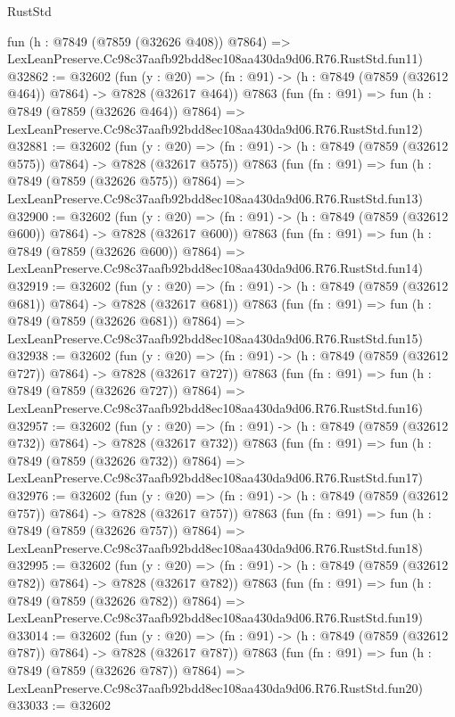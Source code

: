 \begin{lexlean}{RustStd}
\begin{coremodule}
    fun (h : @7849 (@7859 (@32626 @408)) @7864) =>
    LexLeanPreserve.Cc98c37aafb92bdd8ec108aa430da9d06.R76.RustStd.fun11)
@32862 := @32602
    (fun (y : @20) => (fn : @91) -> (h : @7849 (@7859 (@32612 @464)) @7864) -> @7828 (@32617 @464))
    @7863
    (fun (fn : @91) =>
    fun (h : @7849 (@7859 (@32626 @464)) @7864) =>
    LexLeanPreserve.Cc98c37aafb92bdd8ec108aa430da9d06.R76.RustStd.fun12)
@32881 := @32602
    (fun (y : @20) => (fn : @91) -> (h : @7849 (@7859 (@32612 @575)) @7864) -> @7828 (@32617 @575))
    @7863
    (fun (fn : @91) =>
    fun (h : @7849 (@7859 (@32626 @575)) @7864) =>
    LexLeanPreserve.Cc98c37aafb92bdd8ec108aa430da9d06.R76.RustStd.fun13)
@32900 := @32602
    (fun (y : @20) => (fn : @91) -> (h : @7849 (@7859 (@32612 @600)) @7864) -> @7828 (@32617 @600))
    @7863
    (fun (fn : @91) =>
    fun (h : @7849 (@7859 (@32626 @600)) @7864) =>
    LexLeanPreserve.Cc98c37aafb92bdd8ec108aa430da9d06.R76.RustStd.fun14)
@32919 := @32602
    (fun (y : @20) => (fn : @91) -> (h : @7849 (@7859 (@32612 @681)) @7864) -> @7828 (@32617 @681))
    @7863
    (fun (fn : @91) =>
    fun (h : @7849 (@7859 (@32626 @681)) @7864) =>
    LexLeanPreserve.Cc98c37aafb92bdd8ec108aa430da9d06.R76.RustStd.fun15)
@32938 := @32602
    (fun (y : @20) => (fn : @91) -> (h : @7849 (@7859 (@32612 @727)) @7864) -> @7828 (@32617 @727))
    @7863
    (fun (fn : @91) =>
    fun (h : @7849 (@7859 (@32626 @727)) @7864) =>
    LexLeanPreserve.Cc98c37aafb92bdd8ec108aa430da9d06.R76.RustStd.fun16)
@32957 := @32602
    (fun (y : @20) => (fn : @91) -> (h : @7849 (@7859 (@32612 @732)) @7864) -> @7828 (@32617 @732))
    @7863
    (fun (fn : @91) =>
    fun (h : @7849 (@7859 (@32626 @732)) @7864) =>
    LexLeanPreserve.Cc98c37aafb92bdd8ec108aa430da9d06.R76.RustStd.fun17)
@32976 := @32602
    (fun (y : @20) => (fn : @91) -> (h : @7849 (@7859 (@32612 @757)) @7864) -> @7828 (@32617 @757))
    @7863
    (fun (fn : @91) =>
    fun (h : @7849 (@7859 (@32626 @757)) @7864) =>
    LexLeanPreserve.Cc98c37aafb92bdd8ec108aa430da9d06.R76.RustStd.fun18)
@32995 := @32602
    (fun (y : @20) => (fn : @91) -> (h : @7849 (@7859 (@32612 @782)) @7864) -> @7828 (@32617 @782))
    @7863
    (fun (fn : @91) =>
    fun (h : @7849 (@7859 (@32626 @782)) @7864) =>
    LexLeanPreserve.Cc98c37aafb92bdd8ec108aa430da9d06.R76.RustStd.fun19)
@33014 := @32602
    (fun (y : @20) => (fn : @91) -> (h : @7849 (@7859 (@32612 @787)) @7864) -> @7828 (@32617 @787))
    @7863
    (fun (fn : @91) =>
    fun (h : @7849 (@7859 (@32626 @787)) @7864) =>
    LexLeanPreserve.Cc98c37aafb92bdd8ec108aa430da9d06.R76.RustStd.fun20)
@33033 := @32602

\end{coremodule}
\end{lexlean}
